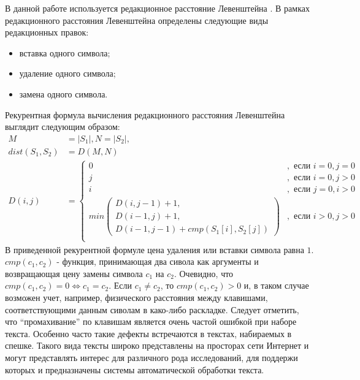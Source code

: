 В данной работе используется редакционное расстояние Левенштейна \cite{manning}. В рамках редакционного расстояния Левенштейна определены следующие виды редакционных правок:
\begin{itemize}
	\item
	вставка одного символа;
	\item
	удаление одного символа;
	\item
	замена одного символа.
\end{itemize}
Рекурентная формула вычисления редакционного расстояния Левенштейна выглядит следующим образом:
\begin{align} 
	M &= |S_1|, N = |S_2|, \\
	dist(S_1, S_2) &= D(M, N) \\
	D(i, j) &= 
	\begin{cases}
		0&,\text{ если } i = 0, j = 0 \\
		j&,\text{ если } i = 0, j > 0 \\
		i&,\text{ если } j = 0, i > 0 \\
		min(\substack{
			D(i, j - 1) + 1, \\
			D(i - 1, j) + 1, \\
			D(i - 1, j - 1) + cmp(S_1[i], S_2[j])
		})&,\text{ если } i > 0, j > 0 \\  
	\end{cases}
\end{align}
В приведенной рекурентной формуле цена удаления или вставки символа равна \(1\). \(cmp(c_1, c_2)\) - функция, принимающая два сивола как аргументы и возвращающая цену замены символа \(c_1\) на \(c_2\). Очевидно, что \( cmp(c_1, c_2) = 0 \Leftrightarrow c_1 = c_2\). Если \(c_1 \neq c_2\), то \( cmp(c_1, c_2) > 0 \) и, в таком случае возможен учет, например, физического расстояния между клавишами, соответствующими данным сиволам в како-либо раскладке. Следует отметить, что ``промахивание'' по клавишам является очень частой ошибкой при наборе текста. Особенно часто такие дефекты встречаются в текстах, набираемых в спешке. Такого вида тексты широко представлены на просторах сети Интернет и могут представлять интерес для различного рода исследований, для поддержи которых и предназначены системы автоматической обработки текста.


